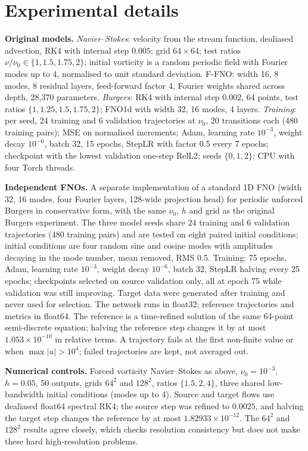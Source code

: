 \documentclass{article}
\theoremstyle{plain}
\begin{document}
\FloatBarrier
\section{Experimental details}
\label{app:setup}

\textbf{Original models.}
\emph{Navier--Stokes}: velocity from the stream function, dealiased advection, RK4 with internal step $0.005$; grid $64\times64$; test ratios $\nu/\nu_0\in\{1,1.5,1.75,2\}$; initial vorticity is a random periodic field with Fourier modes up to 4, normalised to unit standard deviation. F-FNO: width 16, 8 modes, 8 residual layers, feed-forward factor 4, Fourier weights shared across depth, 28,370 parameters.
\emph{Burgers}: RK4 with internal step $0.002$, 64 points, test ratios $\{1,1.25,1.5,1.75,2\}$; FNO1d with width 32, 16 modes, 4 layers.
\emph{Training}: per seed, 24 training and 6 validation trajectories at $\nu_0$, 20 transitions each (480 training pairs); MSE on normalised increments; Adam, learning rate $10^{-3}$, weight decay $10^{-6}$, batch 32, 15 epochs, StepLR with factor 0.5 every 7 epochs; checkpoint with the lowest validation one-step RelL2; seeds $\{0,1,2\}$; CPU with four Torch threads.

\textbf{Independent FNOs.}
A separate implementation of a standard 1D FNO (width 32, 16 modes, four Fourier layers, 128-wide projection head) for periodic unforced Burgers in conservative form, with the same $\nu_0$, $h$ and grid as the original Burgers experiment. The three model seeds share 24 training and 6 validation trajectories (480 training pairs) and are tested on eight paired initial conditions; initial conditions are four random sine and cosine modes with amplitudes decaying in the mode number, mean removed, RMS 0.5. Training: 75 epochs, Adam, learning rate $10^{-3}$, weight decay $10^{-6}$, batch 32, StepLR halving every 25 epochs; checkpoints selected on source validation only, all at epoch 75 while validation was still improving. Target data were generated after training and never used for selection. The network runs in float32; reference trajectories and metrics in float64. The reference is a time-refined solution of the same 64-point semi-discrete equation; halving the reference step changes it by at most $1.053\times10^{-10}$ in relative terms. A trajectory fails at the first non-finite value or when $\max|u|>10^4$; failed trajectories are kept, not averaged out.

\textbf{Numerical controls.}
Forced vorticity Navier--Stokes as above, $\nu_0=10^{-3}$, $h=0.05$, 50 outputs, grids $64^2$ and $128^2$, ratios $\{1.5,2,4\}$, three shared low-bandwidth initial conditions (modes up to 4). Source and target flows use dealiased float64 spectral RK4; the source step was refined to $0.0025$, and halving the target step changes the reference by at most $1.82933\times10^{-12}$. The $64^2$ and $128^2$ results agree closely, which checks resolution consistency but does not make these hard high-resolution problems.
\end{document}
